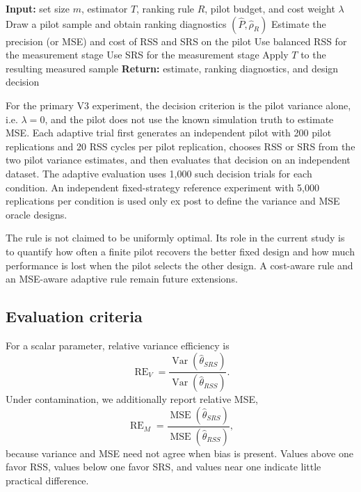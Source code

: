 \documentclass[12pt]{article}
\begin{document}
\begin{algorithm}[H]
\caption{Adaptive RSS--SRS Robust Estimation}
\label{alg:adaptive_rss}
\begin{algorithmic}[1]
\State \textbf{Input:} set size $m$, estimator $T$, ranking rule $R$, pilot budget, and cost weight $\lambda$
\State Draw a pilot sample and obtain ranking diagnostics $(\widehat P,\widehat\rho_R)$
\State Estimate the precision (or MSE) and cost of RSS and SRS on the pilot
    \State Use balanced RSS for the measurement stage
\Else
    \State Use SRS for the measurement stage
\EndIf
\State Apply $T$ to the resulting measured sample
\State \textbf{Return:} estimate, ranking diagnostics, and design decision
\end{algorithmic}
\end{algorithm}

For the primary V3 experiment, the decision criterion is the pilot variance alone, i.e.
$\lambda=0$, and the pilot does not use the known simulation truth to estimate MSE.
Each adaptive trial first generates an independent pilot with 200 pilot replications
and 20 RSS cycles per pilot replication, chooses RSS or SRS from the two pilot
variance estimates, and then evaluates that decision on an independent dataset.
The adaptive evaluation uses 1,000 such decision trials for each condition.
An independent fixed-strategy reference experiment with 5,000 replications per
condition is used only ex post to define the variance and MSE oracle designs.

The rule is not claimed to be uniformly optimal. Its role in the current study is to quantify how often a finite pilot recovers the better fixed design and how much performance is lost when the pilot selects the other design. A cost-aware rule and an MSE-aware adaptive rule remain future extensions.

\subsection{Evaluation criteria}
For a scalar parameter, relative variance efficiency is
\[
\operatorname{RE}_{V}=\frac{\operatorname{Var}(\widehat\theta_{SRS})}
{\operatorname{Var}(\widehat\theta_{RSS})}.
\]
Under contamination, we additionally report relative MSE,
\[
\operatorname{RE}_{M}=\frac{\operatorname{MSE}(\widehat\theta_{SRS})}
{\operatorname{MSE}(\widehat\theta_{RSS})},
\]
because variance and MSE need not agree when bias is present. Values above one favor RSS, values below one favor SRS, and values near one indicate little practical difference.
\end{document}
